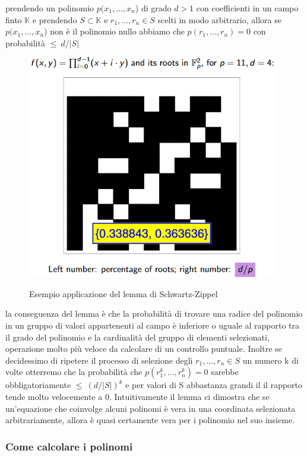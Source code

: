 prendendo un polinomio $p(x_1,...,x_n$) di grado $d > 1$ con coefficienti in un campo finto $\mathbb{K}$ e prendendo 
$S \subset \mathbb{K}$ e $r_1,...,r_n \in S$ scelti in modo arbitrario, allora se $p(x_1,...,x_n$) non è il polinomio nullo
abbiamo che $p(r_1,...,r_n) = 0$ con probabilità $\le \ d/|S|$

\begin{figure}[H]
    \centering
    \includegraphics[width=11cm]{./chapters/1.state-of-art/images/7.schwartz_zippel_lemma.png}
    \label{fig:schwartz-zippel-lemma}
    \captionsetup{justification=centering}
    \caption{Esempio applicazione del lemma di Schwartz-Zippel\cite{23-schwartz-zippel}}
\end{figure}

la conseguenza del lemma è che la probabilità di trovare una radice del polinomio in un gruppo di valori appartenenti al
campo è inferiore o uguale al rapporto tra il grado del polinomio e la cardinalità del gruppo di elementi selezionati,
operazione molto più veloce da calcolare di un controllo puntuale. Inoltre se decidessimo di ripetere il processo di
selezione degli $r_1,...,r_n \in S$ un numero k di volte otterremo che la probabilità che $p(r^k_1,...,r^k_n) = 0$
sarebbe obbligatoriamente $\le \ (d/|S|)^k$  e per valori di S abbastanza grandi il il rapporto tende molto velocemente
a 0. Intuitivamente il lemma ci dimostra che se un'equazione che coinvolge alcuni polinomi è vera in una coordinata
selezionata arbitrariamente, allora è quasi certamente vera per i polinomio nel suo insieme.

\subsubsection{Come calcolare i polinomi}

